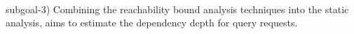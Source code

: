  \\
subgoal-3) Combining the reachability bound analysis techniques into the static analysis,
aims to estimate
the dependency depth for query requests.
